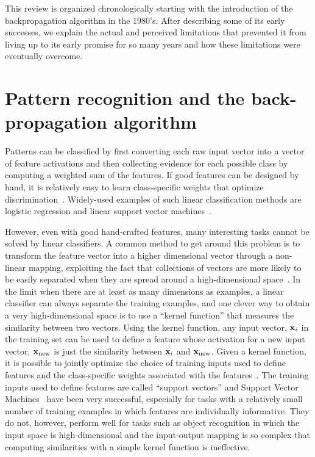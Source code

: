 \documentclass[]{article}
\begin{document}
This review is organized chronologically starting with the introduction of
the backpropagation algorithm in the 1980's. After describing some of its
early successes, we explain the actual and perceived limitations that
prevented it from living up to its early promise for so many years and how
these limitations were eventually overcome.

\section{Pattern recognition and the back-propagation algorithm}

Patterns can be classified by first converting each raw input vector into a
vector of feature activations and then collecting evidence for each
possible class by computing a weighted sum of the features. If good
features can be designed by hand, it is relatively easy to learn
class-specific weights that optimize
discrimination~\citep{Rosenblatt57}. Widely-used examples of such linear
classification methods are logistic regression and linear support vector
machines~\citep{logisticregression,Boser92}.

However, even with good hand-crafted features, many interesting tasks
cannot be solved by linear classifiers. A common method to get around this
problem is to transform the feature vector into a higher dimensional vector
through a non-linear mapping, exploiting the fact that collections of
vectors are more likely to be easily separated when they are spread around
a high-dimensional space~\citep{Cover65}. In the limit when there are at least
as many dimensions as examples, a linear classifier can always separate the
training examples, and one clever way to obtain a very high-dimensional space is to use a
``kernel function'' that measures the similarity between two vectors.
Using the kernel function, any input vector, ${\bf x}_i$ in the training
set can be used to define a feature whose activation for a new input
vector, ${\bf x}_{\rm new}$ is just the similarity between ${\bf x}_i$ and
${\bf x}_{\rm new}$. Given a kernel function, it is possible to jointly
optimize the choice of training inputs used to define features and the
class-specific weights associated with the features~\citep{Boser92}. The training
inputs used to define features are called ``support vectors'' and Support
Vector Machines~\citep{Boser92} have been very successful, especially for
tasks with a relatively small number of training examples in which features
are individually informative. They do not, however, perform well for tasks
such as object recognition in which the input space is high-dimensional and
the input-output mapping is so complex that computing similarities with a
simple kernel function is ineffective.
\end{document}
